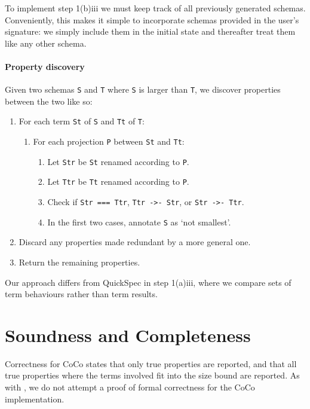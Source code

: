 To implement step 1(b)iii we must keep track of all previously
generated schemas.  Conveniently, this makes it simple to incorporate
schemas provided in the user's signature: we simply include them in
the initial state and thereafter treat them like any other schema.

\paragraph{Property discovery}
Given two schemas \verb|S| and \verb|T| where \verb|S| is larger than
\verb|T|, we discover properties between the two like so:

\begin{enumerate}
\item For each term \verb|St| of \verb|S| and \verb|Tt| of \verb|T|:
  \begin{enumerate}
  \item For each projection \verb|P| between \verb|St| and \verb|Tt|:
    \begin{enumerate}
    \item Let \verb|Str| be \verb|St| renamed according to \verb|P|.
    \item Let \verb|Ttr| be \verb|Tt| renamed according to \verb|P|.
    \item Check if \verb|Str === Ttr|, \verb|Ttr ->- Str|, or
      \verb|Str ->- Ttr|.
    \item In the first two cases, annotate \verb|S| as `not smallest'.
    \end{enumerate}
  \end{enumerate}
\item Discard any properties made redundant by a more general one.
\item Return the remaining properties.
\end{enumerate}

Our approach differs from QuickSpec \parencite{claessen2010,smallbone2017}
in step 1(a)iii, where we compare sets of term behaviours rather than
term results.

\section{Soundness and Completeness}
\label{sec:coco-correctness}

Correctness for CoCo states that only true properties are reported,
and that all true properties where the terms involved fit into the
size bound are reported.  As with \dejafu{}, we do not attempt a proof
of formal correctness for the CoCo implementation.

